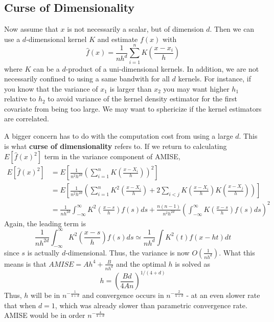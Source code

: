 \documentclass[12pt]{article}
\theoremstyle{definition}
\theoremstyle{property}
\theoremstyle{assumption}
\theoremstyle{example}
\theoremstyle{comment}
\begin{document}
 \subsection{Curse of Dimensionality}
 Now assume that $x$ is not necessarily a scalar, but of dimension $d$. Then we can use a $d$-dimensional kernel $K$ and estimate $f(x)$ with
 \[
 \hat{f}(x)= \frac{1}{nh^d}\sum_{i=1}^nK\left(\frac{x-x_i}{h}\right)
 \]
 where $K$ can be a $d$-product of a uni-dimensional kernels. In addition, we are not necessarily confined to using a same bandwith for all $d$ kernels. For instance, if you know that the variance of $x_1$ is larger than $x_2$ you may want higher $h_1$ relative to $h_2$ to avoid variance of the kernel density estimator for the first covariate from being too large. We may want to sphericize if the kernel estimators are correlated. \par
 A bigger concern has to do with the computation cost from using a large $d$. This is what \textbf{curse of dimensionality} refers to. If we return to calculating $E[\hat{f}(x)^2]$ term in the variance component of AMISE, 
 \footnotesize{\begin{align*}
 E[\hat{f}(x)^2]&=E\left[\frac{1}{n^2h^{2d}}\left(\sum_{i=1}^nK\left(\frac{x-X_i}{h}\right)\right)^2\right]\\
 &=E\left[\frac{1}{n^2h^{2d}}\left(\sum_{i=1}^nK^2\left(\frac{x-X_i}{h}\right)+2\sum_{i<j} K\left(\frac{x-X_i}{h}\right)K\left(\frac{x-X_j}{h}\right)\right)\right]\\
 &=\frac{1}{nh^{2d}}\int_{-\infty}^\infty K^2\left(\frac{x-s}{h}\right)f(s)ds+\frac{n(n-1)}{n^2h^{2d}}\left(\int_{-\infty}^\infty K\left(\frac{x-s}{h}\right)f(s)ds\right)^2
 \end{align*}}\normalsize
 Again, the leading term is
 \[
\frac{1}{nh^{2d}}\int_{-\infty}^\infty K^2\left(\frac{x-s}{h}\right)f(s)ds \simeq \frac{1}{nh^d}\int K^2(t)f(x-ht)dt
 \]
 since $s$ is actually $d$-dimensional. Thus, the variance is now $O\left(\frac{1}{nh^d}\right)$. What this means is that $AMISE=Ah^4+\frac{B}{nh^d}$ and the optimal $h$ is solved as
 \[
 h=\left(\frac{Bd}{4An}\right)^{1/(4+d)}
 \]
 Thus, $h$ will be in $n^{-\frac{1}{4+d}}$ and convergence occurs in $n^{-\frac{2}{4+d}}$ - at an even slower rate that when $d=1$, which was already slower than parametric convergence rate. AMISE would be in order $n^{-\frac{4}{4+d}}$\par
 
\end{document}
